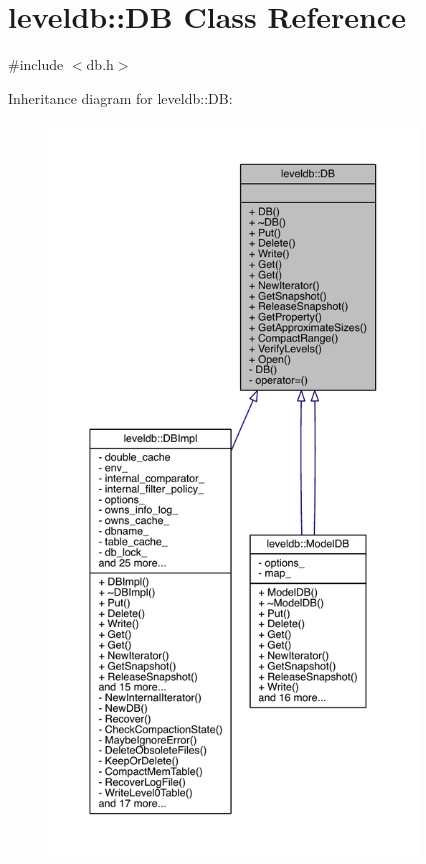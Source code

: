 \hypertarget{classleveldb_1_1_d_b}{}\section{leveldb\+:\+:D\+B Class Reference}
\label{classleveldb_1_1_d_b}


{\ttfamily \#include $<$db.\+h$>$}



Inheritance diagram for leveldb\+:\+:D\+B\+:\nopagebreak
\begin{figure}[H]
\begin{center}
\leavevmode
\includegraphics[height=550pt]{classleveldb_1_1_d_b__inherit__graph}
\end{center}
\end{figure}


